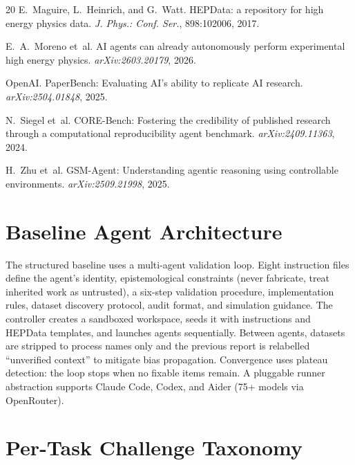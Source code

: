 \documentclass{article}
\begin{document}
\begin{thebibliography}{20}
E.~Maguire, L.~Heinrich, and G.~Watt.
\newblock HEPData: a repository for high energy physics data.
\newblock \emph{J. Phys.: Conf. Ser.}, 898:102006, 2017.

E.~A.~Moreno et~al.
\newblock AI agents can already autonomously perform experimental high energy physics.
\newblock \emph{arXiv:2603.20179}, 2026.

OpenAI.
\newblock PaperBench: Evaluating AI's ability to replicate AI research.
\newblock \emph{arXiv:2504.01848}, 2025.

N.~Siegel et~al.
\newblock CORE-Bench: Fostering the credibility of published research through a computational reproducibility agent benchmark.
\newblock \emph{arXiv:2409.11363}, 2024.

H.~Zhu et~al.
\newblock GSM-Agent: Understanding agentic reasoning using controllable environments.
\newblock \emph{arXiv:2509.21998}, 2025.

\end{thebibliography}


\appendix

\section{Baseline Agent Architecture}
\label{app:agents}

The structured baseline uses a multi-agent validation loop.
Eight instruction files define the agent's identity, epistemological constraints (never fabricate, treat inherited work as untrusted), a six-step validation procedure, implementation rules, dataset discovery protocol, audit format, and simulation guidance.
The controller creates a sandboxed workspace, seeds it with instructions and HEPData templates, and launches agents sequentially.
Between agents, datasets are stripped to process names only and the previous report is relabelled ``unverified context'' to mitigate bias propagation.
Convergence uses plateau detection: the loop stops when no fixable items remain.
A pluggable runner abstraction supports Claude Code, Codex, and Aider (75+ models via OpenRouter).


\section{Per-Task Challenge Taxonomy}
\label{app:challenges}
\end{document}
